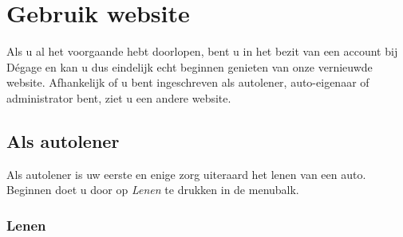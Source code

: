 \documentclass[11pt,a4paper,oneside]{article}
\begin{document}
\section{Gebruik website}
Als u al het voorgaande hebt doorlopen, bent u in het bezit van een account bij D\'egage en kan u dus eindelijk echt beginnen genieten van onze vernieuwde website. Afhankelijk of u bent ingeschreven als autolener, auto-eigenaar of administrator bent, ziet u een andere website.
\subsection{Als autolener}
Als autolener is uw eerste en enige zorg uiteraard het lenen van een auto. Beginnen doet u door op \textit{Lenen} te drukken in de menubalk.
\subsubsection{Lenen}
\label{lenen}
\end{document}
